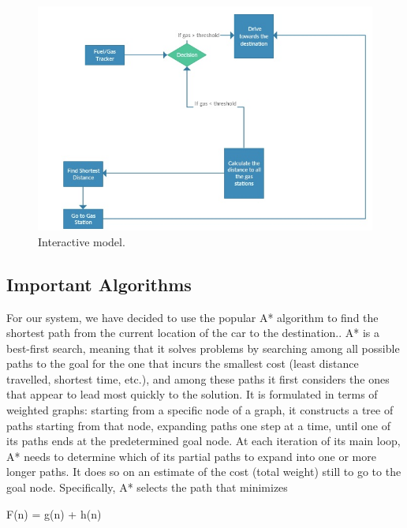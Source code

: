 \documentclass[12pt,onecolumn,titlepage]{article}
\begin{document}
\begin{figure}[H]
  \begin{center}
    \includegraphics[width=1\columnwidth]{22}
  \end{center}
  \caption{\small Interactive model.}
  \label{fig-label}
\end{figure} \par

\subsection{Important Algorithms}
For our system, we have decided to use the popular A* algorithm to find the shortest path from the current location of the car to the destination..
A* is a best-first search, meaning that it solves problems by searching among all possible paths to the goal for the one that incurs the smallest cost (least distance travelled, shortest time, etc.), and among these paths it first considers the ones that appear to lead most quickly to the solution. It is formulated in terms of weighted graphs: starting from a specific node of a graph, it constructs a tree of paths starting from that node, expanding paths one step at a time, until one of its paths ends at the predetermined goal node.
At each iteration of its main loop, A* needs to determine which of its partial paths to expand into one or more longer paths. It does so on an estimate of the cost (total weight) still to go to the goal node. Specifically, A* selects the path that minimizes

\qquad\qquad\qquad\qquad\qquad F(n) = g(n) + h(n)
\end{document}

